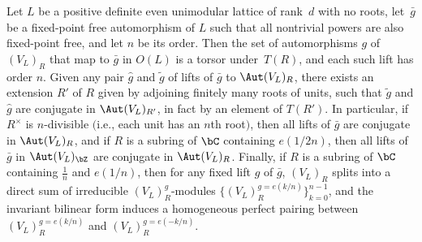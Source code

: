 \begin{lem} \label{lem:fixed-point-free-automorphisms}Let $L$ be a positive definite even unimodular lattice of rank~$d$ with no roots, let~$\bar{g}$ be a fixed-point free automorphism of $L$ such that all nontrivial powers are also fixed-point free, and let $n$ be its order. Then the set of automorphisms $g$ of $(V_L)_R$ that map to $\bar{g}$ in $O(L)$ is a torsor under~$T(R)$, and each such lift has order $n$. Given any pair $\hat{g}$ and $\tilde{g}$ of lifts of $\bar{g}$ to $\Aut (V_L)_R$, there exists an extension $R'$ of $R$ given by adjoining finitely many roots of units, such that $\tilde{g}$ and $\hat{g}$ are conjugate in $\Aut (V_L)_{R'}$, in fact by an element of $T(R')$. In particular, if~$R^\times$ is $n$-divisible $($i.e., each unit has an $n$th root$)$, then all lifts of $\bar{g}$ are conjugate in $\Aut (V_L)_R$, and if $R$ is a subring of $\bC$ containing $e(1/2n)$, then all lifts of $\bar{g}$ in $\Aut (V_L)_\bZ$ are conjugate in $\Aut (V_L)_R$. Finally, if $R$ is a subring of $\bC$ containing $\frac{1}{n}$ and $e(1/n)$, then for any fixed lift $g$ of $\bar{g}$, $(V_L)_R$ splits into a direct sum of irreducible $(V_L)_R^g$-modules $\big\{ (V_L)_R^{g = e(k/n)} \big\}_{k=0}^{n-1}$, and the invariant bilinear form induces a homogeneous perfect pairing between $(V_L)_R^{g = e(k/n)}$ and $(V_L)_R^{g = e(-k/n)}$.
\end{lem}
